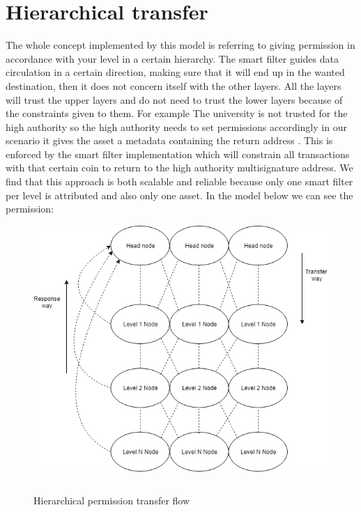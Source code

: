 \documentclass[conference]{IEEEtran}
\begin{document}
\section{Hierarchical transfer}
The whole concept implemented by this model is referring to giving permission in accordance with your level in a certain hierarchy. The smart filter guides data circulation in a certain direction, making sure that it will end up in the wanted destination, then it does not concern itself with the other layers. All the layers will trust the upper layers and do not need to trust the lower layers because of the constraints given to them. For example The university is not trusted for the high authority so the high authority needs to set permissions accordingly in our scenario it gives the asset a metadata containing the return address . This is enforced by the smart filter implementation which will constrain all transactions with that certain coin to return to the high authority multisignature address. We find that this approach is both scalable and reliable because only one smart filter per level is attributed and also only one asset. In the model below we can see the permission:
\begin{figure}[h!]
  \includegraphics[width=\linewidth]{hierarchical.png}
  \caption{Hierarchical permission transfer flow}
  \begin{tabular}{r@{: }l r@{: }l}
\end{tabular}
\end{figure}
\end{document}

